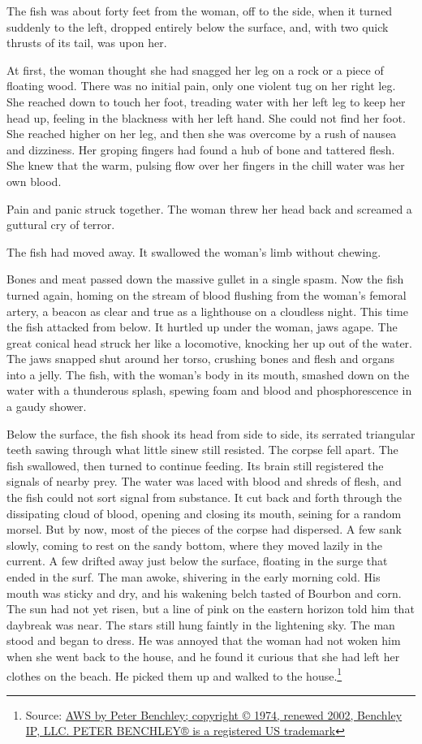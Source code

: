 \documentclass[10pt,a5paper,twoside]{book}
\newcommand{\source}[2]{\footnote{Source: \href{#2}{#1}}}
\begin{document}
The fish was about forty feet from the woman, off to the side, when it turned suddenly to the left, dropped entirely below the surface, and, with two quick thrusts of its tail, was upon her.

At first, the woman thought she had snagged her leg on a rock or a piece of floating wood. There was no initial pain, only one violent tug on her right leg. She reached down to touch her foot, treading water with her left leg to keep her head up, feeling in the blackness with her left hand. She could not find her foot. She reached higher on her leg, and then she was overcome by a rush of nausea and dizziness. Her groping fingers had found a hub of bone and tattered flesh. She knew that the warm, pulsing flow over her fingers in the chill water was her own blood.

Pain and panic struck together. The woman threw her head back and screamed a guttural cry of terror.

The fish had moved away. It swallowed the woman's limb without chewing.

Bones and meat passed down the massive gullet in a single spasm. Now the fish turned again, homing on the stream of blood flushing from the woman's femoral artery, a beacon as clear and true as a lighthouse on a cloudless night. This time the fish attacked from below. It hurtled up under the woman, jaws agape. The great conical head struck her like a locomotive, knocking her up out of the water. The jaws snapped shut around her torso, crushing bones and flesh and organs into a jelly. The fish, with the woman's body in its mouth, smashed down on the water with a thunderous splash, spewing foam and blood and phosphorescence in a gaudy shower.

Below the surface, the fish shook its head from side to side, its serrated triangular teeth sawing through what little sinew still resisted. The corpse fell apart. The fish swallowed, then turned to continue feeding. Its brain still registered the signals of nearby prey. The water was laced with blood and shreds of flesh, and the fish could not sort signal from substance. It cut back and forth through the dissipating cloud of blood, opening and closing its mouth, seining for a random morsel. But by now, most of the pieces of the corpse had dispersed. A few sank slowly, coming to rest on the sandy bottom, where they moved lazily in the current. A few drifted away just below the surface, floating in the surge that ended in the surf. The man awoke, shivering in the early morning cold. His mouth was sticky and dry, and his wakening belch tasted of Bourbon and corn. The sun had not yet risen, but a line of pink on the eastern horizon told him that daybreak was near. The stars still hung faintly in the lightening sky. The man stood and began to dress. He was annoyed that the woman had not woken him when she went back to the house, and he found it curious that she had left her clothes on the beach. He picked them up and walked to the house.\source{AWS by Peter Benchley; copyright © 1974, renewed 2002, Benchley IP, LLC. PETER BENCHLEY® is a registered US trademark}{https://horror.systime.dk/}
\end{document}
